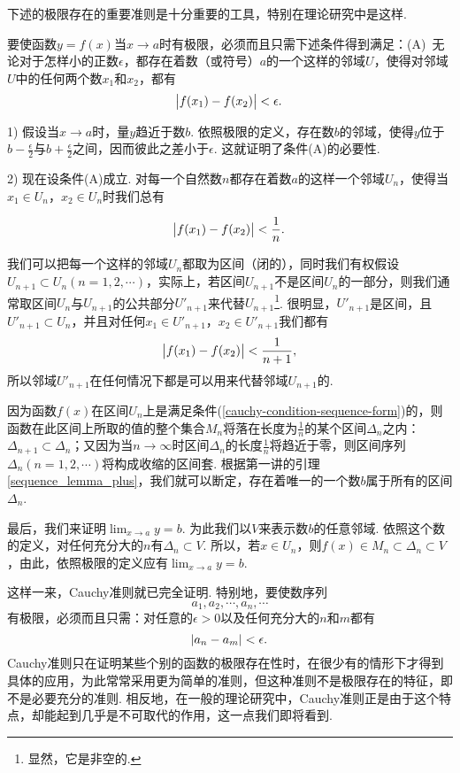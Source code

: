 \documentclass[color=cyan,mathpazo,titlestyle=hang]{elegantbook_mac}
\begin{document}
下述的极限存在的重要准则是十分重要的工具，特别在理论研究中是这样. 

\begin{newthem}[Cauchy准则]
要使函数$y=f(x)$当$x\to a$时有极限，必须而且只需下述条件得到满足：(A)\ 无论对于怎样小的正数$\epsilon$，都存在着数（或符号）$a$的一个这样的邻域$U$，使得对邻域$U$中的任何两个数$x_1$和$x_2$，都有$$\abs{f(x_1)-f(x_2)} < \epsilon .$$
\end{newthem}

\begin{newproof}
1) 假设当$x\to a$时，量$y$趋近于数$b$. 依照极限的定义，存在数$b$的邻域，使得$y$位于$b-\frac{\epsilon}{2}$与$b+\frac{\epsilon}{2}$之间，因而彼此之差小于$\epsilon$. 这就证明了条件(A)的必要性.

2) 现在设条件(A)成立. 对每一个自然数$n$都存在着数$a$的这样一个邻域$U_n$，使得当$x_1\in U_n$，$x_2\in U_n$时我们总有

\begin{equation}
\abs{f(x_1)-f(x_2)} < \frac{1}{n}.
\label{cauchy-condition-sequence-form}
\end{equation}

我们可以把每一个这样的邻域$U_n$都取为区间（闭的），同时我们有权假设$U_{n+1}\subset U_n(n=1,2,\cdots)$，实际上，若区间$U_{n+1}$不是区间$U_n$的一部分，则我们通常取区间$U_n$与$U_{n+1}$的公共部分$U'_{n+1}$来代替$U_{n+1}$\footnote{显然，它是非空的.}. 很明显，$U'_{n+1}$是区间，且$U'_{n+1}\subset U_n$，并且对任何$x_1\in U'_{n+1}$，$x_2\in U'_{n+1}$我们都有
$$
\abs{f(x_1)-f(x_2)} < \frac{1}{n+1},
$$
所以邻域$U'_{n+1}$在任何情况下都是可以用来代替邻域$U_{n+1}$的.

因为函数$f(x)$在区间$U_n$上是满足条件(\ref{cauchy-condition-sequence-form})的，则函数在此区间上所取的值的整个集合$M_n$将落在长度为$\frac{1}{n}$的某个区间$\Delta_n$之内：$\Delta_{n+1}\subset \Delta_n$；又因为当$n\to \infty$时区间$\Delta_n$的长度$\frac{1}{n}$将趋近于零，则区间序列$\Delta_n(n=1,2,\cdots)$将构成收缩的区间套. 根据第一讲的引理\ref{sequence_lemma_plus}，我们就可以断定，存在着唯一的一个数$b$属于所有的区间$\Delta_n$.

最后，我们来证明$\lim_{x\to a}y = b$. 为此我们以$V$来表示数$b$的任意邻域. 依照这个数的定义，对任何充分大的$n$有$\Delta_n\subset V$. 所以，若$x\in U_n$，则$f(x)\in M_n \subset \Delta_n \subset V$，由此，依照极限的定义应有$\lim_{x\to a}y = b$.
\end{newproof}

这样一来，Cauchy准则就已完全证明. 特别地，要使数序列
$$
a_1, a_2, \cdots, a_n, \cdots
$$
有极限，必须而且只需：对任意的$\epsilon > 0$以及任何充分大的$n$和$m$都有
$$
\abs{a_n - a_m} < \epsilon.
$$
Cauchy准则只在证明某些个别的函数的极限存在性时，在很少有的情形下才得到具体的应用，为此常常采用更为简单的准则，但这种准则不是极限存在的特征，即不是必要充分的准则. 相反地，在一般的理论研究中，Cauchy准则正是由于这个特点，却能起到几乎是不可取代的作用，这一点我们即将看到. 
\end{document}
